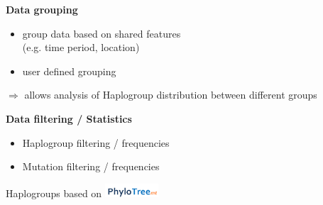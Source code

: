 \documentclass[a0paper,portrait]{baposter}
\begin{document}
\begin{poster}
{	\begin{minipage}[t]{0.5\textwidth}
		\textbf{Data grouping}
		\begin{itemize}[leftmargin=*]
			\item group data based on shared features \\
			(e.g. time period, location)
			\item user defined grouping
		\end{itemize}
		$\Rightarrow$ allows analysis of Haplogroup distribution between different groups
	\end{minipage}
	\hspace{0.5em}
	\begin{minipage}[t]{0.5\textwidth}
		\textbf{Data filtering / Statistics}
		\begin{itemize}[leftmargin=*]
			\item Haplogroup filtering / frequencies
			\item Mutation filtering / frequencies
		\end{itemize}
		Haplogroups based on \includegraphics[width=2cm]{figures/phylotree.png}
	\end{minipage}

	\vspace{1em}

}
\end{poster}
\end{document}
